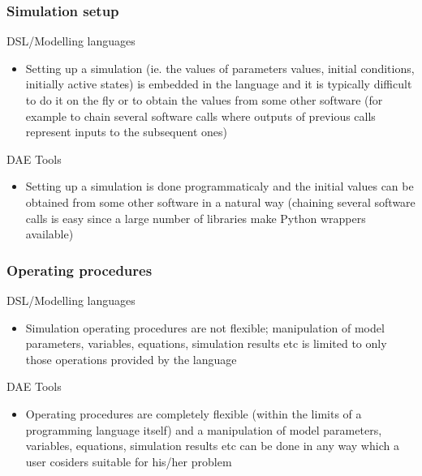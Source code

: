 \documentclass{beamer}
\begin{document}
\begin{frame}
\frametitle{Simulation setup}
\begin{block}{\textcolor{light_red}{DSL/Modelling languages}}
\begin{itemize}
  \item Setting up a simulation (ie. the values of parameters values, initial conditions, initially active states)
        is embedded in the language and it is typically difficult to do it on the fly or to obtain the values from some other software
        (for example to chain several software calls where outputs of previous calls represent inputs to the subsequent ones) 
\end{itemize}
\end{block}

\begin{block}{\textcolor{light_green}{DAE Tools}}
\begin{itemize}
  \item Setting up a simulation is done programmaticaly and the initial values can be obtained from some other software in a natural way
        (chaining several software calls is easy since a large number of libraries make Python wrappers available)
\end{itemize}
\end{block}
\end{frame}

\begin{frame}
\frametitle{Operating procedures}
\begin{block}{\textcolor{light_red}{DSL/Modelling languages}}
\begin{itemize}
  \item Simulation operating procedures are not flexible; manipulation of model parameters, variables, equations, simulation results
        etc is limited to only those operations provided by the language 
\end{itemize}
\end{block}

\begin{block}{\textcolor{light_green}{DAE Tools}}
\begin{itemize}
  \item Operating procedures are completely flexible (within the limits of a programming language itself)
        and a manipulation of model parameters, variables, equations, simulation results etc can be done in any way which
        a user cosiders suitable for his/her problem 
\end{itemize}
\end{block}
\end{frame}
\end{document}
